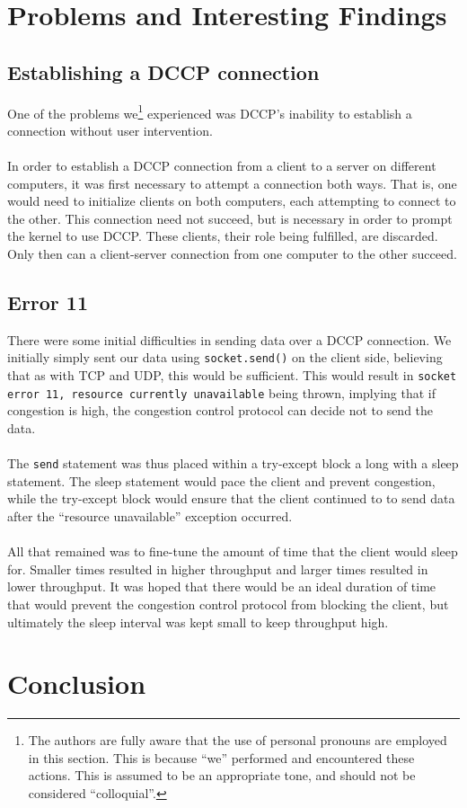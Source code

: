 \documentclass[10pt,a4paper]{article}
\begin{document}
\section{Problems and Interesting Findings}
\label{complications}

\subsection{Establishing a DCCP connection}
One of the problems we\footnote{The authors are fully aware
that the use of personal pronouns are employed in this section. This is because
``we'' performed and encountered these actions. This is assumed to be an
appropriate tone, and should not be considered ``colloquial''.} experienced was
DCCP's inability to establish a connection
without user intervention. 
\paragraph{}
In order to establish a DCCP connection from a client to
a server on different computers, it was first necessary to attempt a connection both ways. 
That is, one would need to initialize clients on both computers, each attempting
to connect
to the other. This connection need not succeed, but 
is necessary in order to prompt the kernel to use DCCP.
These clients, their role being fulfilled, are
discarded. Only then can a client-server connection from one computer to the
other succeed.

\subsection{Error 11}
There were some initial difficulties in sending data over a DCCP connection. We initially
simply sent our data using \texttt{socket.send()} on the client side, believing
that as with TCP
and UDP, this would be sufficient. This would result in \texttt{socket error
11, resource currently
unavailable} being thrown, implying that if congestion is high, the congestion
control 
protocol can decide not to send the data.
\paragraph{}
The \texttt{send} statement was thus placed within a try-except
block a long with a sleep statement. The sleep statement would pace the client
and prevent
congestion, while the try-except block would ensure that the client
continued to  to send data after the ``resource unavailable'' exception
occurred. 
\paragraph{}
All that remained was to fine-tune the amount of time that the client would
sleep for. Smaller times resulted
in higher throughput and larger times resulted in lower throughput. It was hoped that there would be
an ideal duration of time that would prevent the congestion control protocol from blocking the client,
but ultimately the sleep interval was kept small to keep throughput high.

\section{Conclusion}
\end{document}
